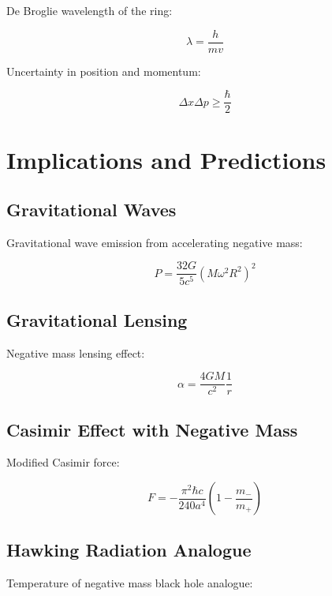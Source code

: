 \documentclass{article}
\begin{document}
De Broglie wavelength of the ring:

\begin{equation}
    \lambda = \frac{h}{mv}
\end{equation}

Uncertainty in position and momentum:

\begin{equation}
    \Delta x \Delta p \geq \frac{\hbar}{2}
\end{equation}

\section{Implications and Predictions}

\subsection{Gravitational Waves}

Gravitational wave emission from accelerating negative mass:

\begin{equation}
    P = \frac{32G}{5c^5} (M\omega^2 R^2)^2
\end{equation}

\subsection{Gravitational Lensing}

Negative mass lensing effect:

\begin{equation}
    \alpha = \frac{4GM}{c^2}\frac{1}{r}
\end{equation}

\subsection{Casimir Effect with Negative Mass}

Modified Casimir force:

\begin{equation}
    F = -\frac{\pi^2 \hbar c}{240 a^4} (1 - \frac{m_-}{m_+})
\end{equation}

\subsection{Hawking Radiation Analogue}

Temperature of negative mass black hole analogue:
\end{document}
